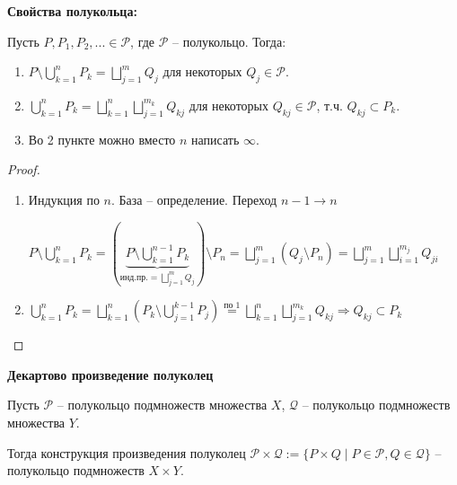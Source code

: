 \begin{theorem}
    \textbf{Свойства полукольца:}

    Пусть $P, P_1, P_2, ... \in \mathcal{P}$, где $\mathcal{P}$ – полукольцо. Тогда:
    \begin{enumerate}
        \item $P\setminus \bigcup\limits_{k=1}^n P_k= \bigsqcup\limits_{j=1}^m Q_j$ для некоторых $Q_j\in \mathcal{P}$.
        \item $\bigcup\limits_{k=1}^n P_k=\bigsqcup\limits_{k=1}^n \bigsqcup\limits_{j=1}^{m_k} Q_{kj}$ для некоторых $Q_{kj}\in \mathcal{P}$, т.ч. $Q_{kj}\subset P_k$.
        \item Во 2 пункте можно вместо $n$ написать $\infty$.
    \end{enumerate}
\end{theorem}

\begin{proof}~
    \begin{enumerate}
        \item Индукция по $n$. База – определение. Переход $n -1 \rightarrow n$
        
        $P \setminus \bigcup\limits_{k=1}^n P_k = (\underbrace{P \setminus \bigcup\limits_{k=1}^{n-1} P_k}_{\text{инд.пр.} = \bigsqcup\limits_{j=1}^m Q_j}) 
        \setminus P_n=\bigsqcup\limits_{j=1}^m (Q_j \setminus P_n) = \bigsqcup\limits_{j=1}^m\bigsqcup\limits_{i=1}^{m_j} Q_{ji}$

        \item $\bigcup\limits_{k=1}^n P_k = \bigsqcup\limits_{k=1}^n (P_k \setminus \bigcup\limits_{j=1}^{k -1} P_j)\overset{\text{по 1}}{=}
        \bigsqcup\limits_{k=1}^n \bigsqcup\limits_{j=1}^{m_k}Q_{kj}\Rightarrow Q_{kj}\subset P_k$
    \end{enumerate}
\end{proof}

\begin{theorem}
    \textbf{Декартово произведение полуколец}

    Пусть $\mathcal{P}$ – полукольцо подмножеств множества $X$, $\mathcal{Q}$ – полукольцо подмножеств множества $Y$.

    Тогда конструкция произведения полуколец $\mathcal{P}\times \mathcal{Q} := \{ P\times Q \mid P \in \mathcal{P}, Q\in \mathcal{Q}\}$ – полукольцо подмножеств $X\times Y$.
\end{theorem}


